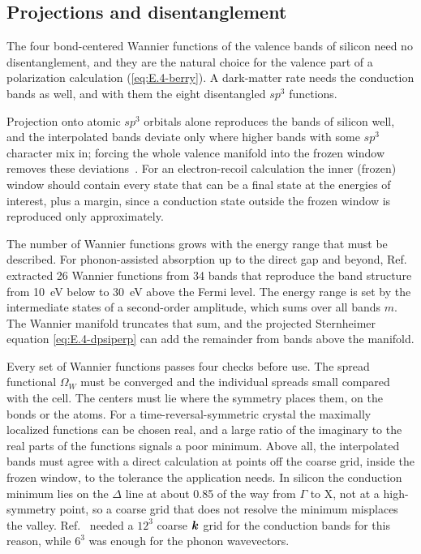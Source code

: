 \subsection{Projections and disentanglement}

The four bond-centered Wannier functions of the valence bands of silicon need no disentanglement, and they are the natural choice for the valence part of a polarization calculation (\cref{eq:E.4-berry}). A dark-matter rate needs the conduction bands as well, and with them the eight disentangled $sp^3$ functions.

Projection onto atomic $sp^3$ orbitals alone reproduces the bands of silicon well, and the interpolated bands deviate only where higher bands with some $sp^3$ character mix in; forcing the whole valence manifold into the frozen window removes these deviations~\cite[Fig.~5]{marzari2012maximally}. For an electron-recoil calculation the inner (frozen) window should contain every state that can be a final state at the energies of interest, plus a margin, since a conduction state outside the frozen window is reproduced only approximately.

The number of Wannier functions grows with the energy range that must be described. For phonon-assisted absorption up to the direct gap and beyond, Ref.~\cite{noffsinger2012phonon} extracted 26 Wannier functions from 34 bands that reproduce the band structure from \SI{10}{eV} below to \SI{30}{eV} above the Fermi level. The energy range is set by the intermediate states of a second-order amplitude, which sums over all bands $m$. The Wannier manifold truncates that sum, and the projected Sternheimer equation \cref{eq:E.4-dpsiperp} can add the remainder from bands above the manifold.

Every set of Wannier functions passes four checks before use. The spread functional $\Omega_W$ must be converged and the individual spreads small compared with the cell. The centers must lie where the symmetry places them, on the bonds or the atoms. For a time-reversal-symmetric crystal the maximally localized functions can be chosen real, and a large ratio of the imaginary to the real parts of the functions signals a poor minimum. Above all, the interpolated bands must agree with a direct calculation at points off the coarse grid, inside the frozen window, to the tolerance the application needs. In silicon the conduction minimum lies on the $\Delta$ line at about 0.85 of the way from $\Gamma$ to X, not at a high-symmetry point, so a coarse grid that does not resolve the minimum misplaces the valley. Ref.~\cite{ponce2018towards} needed a $12^3$ coarse $\bm{k}$ grid for the conduction bands for this reason, while $6^3$ was enough for the phonon wavevectors.

